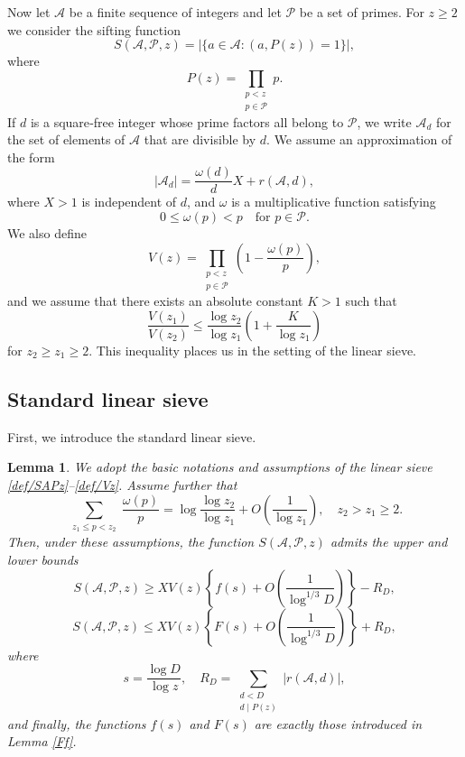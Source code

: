 \documentclass[12pt, a4paper]{amsart}
\def\leq{\leqslant}
\def\geq{\geqslant}
\def\le{\leqslant}
\def\ge{\geqslant}
\theoremstyle{plain}
\newtheorem{lemma}[proposition]{Lemma}
\theoremstyle{remark}
\numberwithin{equation}{section}
\begin{document}
Now let $\mathscr{A}$ be a finite sequence of integers and let $\mathscr{P}$ be a set of primes. For $z \ge 2$ we consider the sifting function
\begin{equation}\label{def/SAPz}
S(\mathscr{A},\mathscr{P},z) = | \{ a \in \mathscr{A} : (a, P(z)) = 1 \} |,
\end{equation}
where
\begin{equation}\label{def/Pz}
P(z) = \prod_{\substack{p < z \\ p \in \mathscr{P}}} p.
\end{equation}
If $d$ is a square‑free integer whose prime factors all belong to $\mathscr{P}$, we write $\mathscr{A}_d$ for the set of elements of $\mathscr{A}$ that are divisible by $d$. We assume an approximation of the form
\begin{equation}\label{RIcon1}
|\mathscr{A}_d| = \frac{\omega(d)}{d} X + r(\mathscr{A},d),
\end{equation}
where $X>1$ is independent of $d$, and $\omega$ is a multiplicative function satisfying
\begin{equation}\label{RIcon2}
0 \le \omega(p) < p \quad \text{for } p \in \mathscr{P}.
\end{equation}
We also define
\begin{equation}\label{def/Vz}
V(z) = \prod_{\substack{p < z \\ p \in \mathscr{P}}} \left( 1 - \frac{\omega(p)}{p} \right),
\end{equation}
and we assume that there exists an absolute constant $K > 1$ such that
\begin{equation}\label{RIcon3}
\frac{V(z_1)}{V(z_2)} \le \frac{\log z_2}{\log z_1} \left( 1 + \frac{K}{\log z_1} \right)
\end{equation}
for $z_2 \ge z_1 \ge 2$. This inequality places us in the setting of the linear sieve.

\subsection{Standard linear sieve}
First, we introduce the standard linear sieve\cite{Iwa81}.

\begin{lemma}\label{Sieve-standard}
We adopt the basic notations and assumptions of the linear sieve \eqref{def/SAPz}--\eqref{def/Vz}.
Assume further that
\begin{equation}\label{Iwacon}
\sum_{\substack{z_1 \le p < z_2}} \frac{\omega(p)}{p} = \log \frac{\log z_2}{\log z_1} 
+ O\left(\frac{1}{\log z_1}\right),\quad z_2 > z_1 \ge 2.
\end{equation}
Then, under these assumptions, the function 
$S(\mathscr{A}, \mathscr{P}, z)$ admits the upper and lower bounds 
\[
S(\mathscr{A}, \mathscr{P}, z) \geq XV(z)\left\{f(s) + O\left(\frac{1}{\log^{1/3} D}\right)\right\} - R_D,
\]
\[
S(\mathscr{A}, \mathscr{P}, z) \leq XV(z)\left\{F(s) + O\left(\frac{1}{\log^{1/3} D}\right)\right\} + R_D, 
\]
where 
\[
s = \frac{\log D}{\log z}, \quad R_D = \sum_{\substack{d < D \\ d \mid P(z)}} |r(\mathscr{A},d)|,
\]
and finally, the functions $f(s)$ and $F(s)$ are exactly those introduced in Lemma \ref{Ff}.
\end{lemma}
\end{document}
